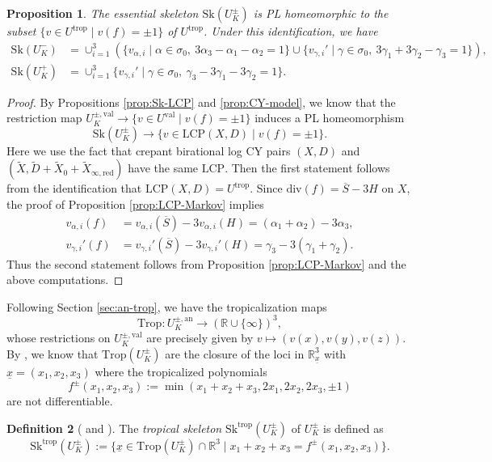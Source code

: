\documentclass[reqno, 12pt]{amsart}
\newtheorem{prop}{Proposition}[section]
\theoremstyle{definition}
\newtheorem{defn}[prop]{Definition}
\newcommand{\bR}{\mathbb{R}}
\newcommand{\tX}{\widetilde{X}}
\newcommand{\tD}{\widetilde{D}}
\newcommand{\Trop}{\mathrm{Trop}}
\newcommand{\trop}{\mathrm{trop}}
\newcommand{\oS}{\overline{S}}
\newcommand{\Sk}{\mathrm{Sk}}
\newcommand{\an}{\mathrm{an}}
\newcommand{\val}{\mathrm{val}}
\newcommand{\LCP}{\mathrm{LCP}}
\newcommand{\red}{\mathrm{red}}
\newcommand{\ux}{\underline{x}}
\numberwithin{equation}{section}
\begin{document}
\begin{prop}\label{prop:Sk-Markov}
The essential skeleton
$\Sk(U_K^{\pm})$ is PL homeomorphic to the subset $\{v\in U^{\trop}\mid v(f) =  \pm 1\}$ of $U^{\trop}$. Under this identification, we have
\begin{align*}
\Sk(U_K^-) &= 
\cup_{i=1}^3(\{v_{\alpha,i}\mid \alpha\in \sigma_0,~3\alpha_3 -\alpha_1 - \alpha_2  =  1\} \cup \{v_{\gamma, i}'\mid \gamma\in \sigma_0,~3\gamma_1+3\gamma_2 - \gamma_3 = 1\}),\\
\Sk(U_K^+) &= \cup_{i=1}^3\{v_{\gamma, i}'\mid \gamma\in\sigma_0,~\gamma_3 - 3\gamma_1-3\gamma_2 = 1\}.
\end{align*}
\end{prop}

\begin{proof}
By Propositions \ref{prop:Sk-LCP} and \ref{prop:CY-model}, we know that the restriction map $U_K^{\pm,\val} \to \{v\in U^{\val}\mid v(f) = \pm 1\}$ induces a PL homeomorphism 
\[
\Sk(U_K^{\pm}) \to \{v\in \LCP(X,D)\mid v(f) = \pm 1\}.
\]
Here we use the fact that crepant birational log CY pairs $(X,D)$ and  $(\tX,\tD+\tX_0 +\tX_{\infty, \red})$ have the same $\LCP$. 
Then the first statement follows from the identification that $\LCP(X,D) = U^{\trop}$.
Since $\mathrm{div}(f) = \oS - 3H$ on $X$,  the proof of Proposition \ref{prop:LCP-Markov} implies 
\begin{align*}
v_{\alpha,i}(f) &  = v_{\alpha,i}(\oS) -  3v_{\alpha,i}(H) = (\alpha_1+\alpha_2) - 3 \alpha_3, \\
v_{\gamma,i}'(f) &  = v_{\gamma,i}'(\oS) -  3v_{\gamma,i}'(H) = \gamma_3 - 3(\gamma_1+\gamma_2).
\end{align*}
Thus the second statement follows from Proposition \ref{prop:LCP-Markov} and the above computations.
\end{proof}


Following Section \ref{sec:an-trop}, we have the tropicalization maps 
\begin{equation}\label{eq:tropicalization}
    \Trop: U_K^{\pm,\an} \to (\bR\cup \{\infty\})^3,
\end{equation}
whose restrictions on $U_K^{\pm,\val}$ are precisely given by $v\mapsto (v(x), v(y), v(z))$. By \cite[Section 2]{Jan23}, we know that $\Trop(U_K^{\pm})$ are the closure of the loci in $\bR^3_{\ux}$ with $\ux = (x_1,x_2,x_3)$ where the tropicalized polynomials
\[
f^{\pm}(x_1,x_2,x_3):=\min(x_1+x_2+x_3, 2x_1, 2x_2, 2x_3, \pm 1)
\]
are not differentiable.

\begin{defn}[{\cite[Definition 3.2]{Jan23} and \cite{Fil19}}]\label{def:Sk-trop}
The \emph{tropical skeleton} $\Sk^{\trop}(U_K^{\pm})$ of $U_K^{\pm}$ is defined as 
\[
\Sk^{\trop}(U_K^{\pm}):= \{\ux\in \Trop(U_K^{\pm})\cap \bR^3\mid x_1+x_2+x_3=f^{\pm}(x_1,x_2,x_3)\}.
\]
\end{defn}
\end{document}
